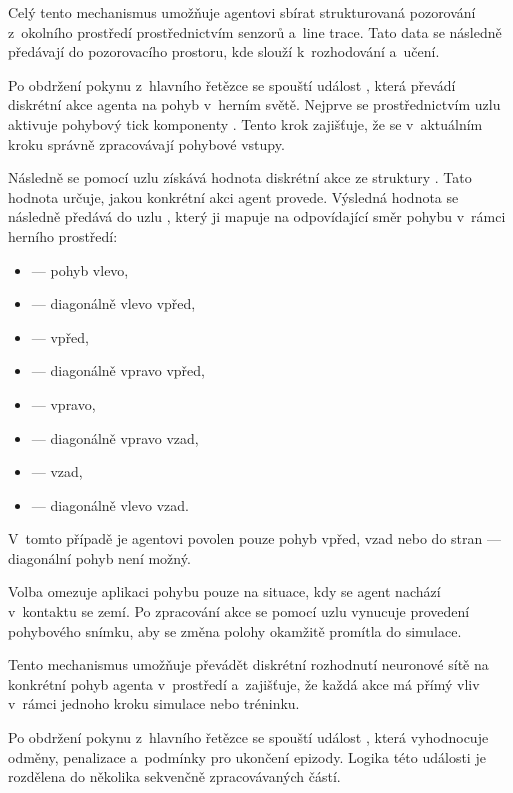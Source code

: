 Celý tento mechanismus umožňuje agentovi sbírat strukturovaná pozorování z~okolního prostředí prostřednictvím senzorů a~line trace. Tato data se následně předávají do pozorovacího prostoru, kde slouží k~rozhodování a~učení.

Po obdržení pokynu z~hlavního řetězce se spouští událost , která převádí diskrétní akce agenta na pohyb v~herním světě. Nejprve se prostřednictvím uzlu  aktivuje pohybový tick komponenty . Tento krok zajišťuje, že se v~aktuálním kroku správně zpracovávají pohybové vstupy.

Následně se pomocí uzlu  získává hodnota diskrétní akce ze struktury . Tato hodnota určuje, jakou konkrétní akci agent provede. Výsledná hodnota se následně předává do uzlu , který ji mapuje na odpovídající směr pohybu v~rámci herního prostředí:

\begin{itemize}
\item {} — pohyb vlevo,
\item {} — diagonálně vlevo vpřed,
\item {} — vpřed,
\item {} — diagonálně vpravo vpřed,
\item {} — vpravo,
\item {} — diagonálně vpravo vzad,
\item {} — vzad,
\item {} — diagonálně vlevo vzad.
\end{itemize}

V~tomto případě je agentovi povolen pouze pohyb vpřed, vzad nebo do stran — diagonální pohyb není možný.

Volba  omezuje aplikaci pohybu pouze na situace, kdy se agent nachází v~kontaktu se zemí. Po zpracování akce se pomocí uzlu  vynucuje provedení pohybového snímku, aby se změna polohy okamžitě promítla do simulace.

Tento mechanismus umožňuje převádět diskrétní rozhodnutí neuronové sítě na konkrétní pohyb agenta v~prostředí a~zajišťuje, že každá akce má přímý vliv v~rámci jednoho kroku simulace nebo tréninku.

Po obdržení pokynu z~hlavního řetězce se spouští událost , která vyhodnocuje odměny, penalizace a~podmínky pro ukončení epizody. Logika této události je rozdělena do několika sekvenčně zpracovávaných částí.


